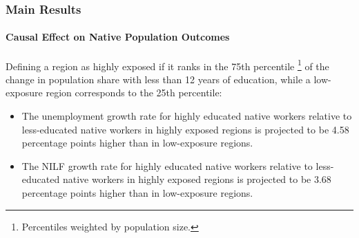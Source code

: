 \begin{frame}
    \frametitle{Main Results}
    \framesubtitle{Causal Effect on Native Population Outcomes}

    Defining a region as highly exposed if it ranks in the 75th percentile \footnote{Percentiles weighted by population size.} of the change in population share with less than 12 years of education, while a low-exposure region corresponds to the 25th percentile:

    \begin{itemize}
        \item The unemployment growth rate for highly educated native workers relative to less-educated native workers in highly exposed regions is projected to be 4.58 percentage points higher than in low-exposure regions.

        \item The NILF growth rate for highly educated native workers relative to less-educated native workers in highly exposed regions is projected to be 3.68 percentage points higher than in low-exposure regions.
    \end{itemize}
\end{frame}

